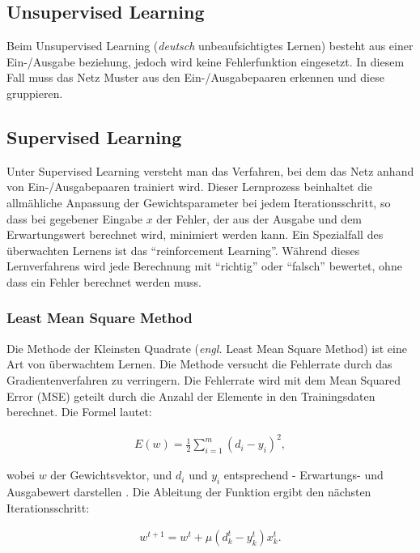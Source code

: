 
\subsection{Unsupervised Learning}
Beim Unsupervised Learning (\textit{deutsch} unbeaufsichtigtes Lernen) besteht aus einer Ein-/Ausgabe beziehung, jedoch wird keine Fehlerfunktion eingesetzt. In diesem Fall muss das Netz Muster aus den Ein-/Ausgabepaaren erkennen und diese gruppieren.

\subsection{Supervised Learning}

Unter Supervised Learning versteht man das Verfahren, bei dem das Netz anhand von Ein-/Ausgabepaaren trainiert wird. Dieser Lernprozess beinhaltet die allmähliche Anpassung der Gewichtsparameter bei jedem Iterationsschritt, so dass bei gegebener Eingabe $x$ der Fehler, der aus der Ausgabe und dem Erwartungswert berechnet wird, minimiert werden kann. Ein Spezialfall des überwachten Lernens ist das ``reinforcement Learning''. Während dieses Lernverfahrens wird jede Berechnung mit ``richtig'' oder ``falsch'' bewertet, ohne dass ein Fehler berechnet werden muss. \cite{SCTemassi:01} 

\subsubsection{Least Mean Square Method}
Die Methode der Kleinsten Quadrate (\textit{engl.} Least Mean Square Method) ist eine Art von überwachtem Lernen. Die Methode versucht die Fehlerrate durch das Gradientenverfahren zu verringern. Die Fehlerrate wird mit dem Mean Squared Error (MSE) geteilt durch die Anzahl der Elemente in den Trainingsdaten berechnet. Die Formel lautet: 

\begin{align}
E(w) = \frac{1}{2} \sum_{i=1}^{m}(d_i - y_i)^2 \label{MSE}, 
\end{align}

wobei $w$ der Gewichtsvektor, und $d_i$ und $y_i$ entsprechend - Erwartungs- und Ausgabewert darstellen \cite{CIKruse:15}. Die Ableitung der Funktion ergibt den nächsten Iterationsschritt:

\begin{align}
w^{t+1} = w^t + \mu(d_k^t - y_k^t)x_k^t.
\end{align}

